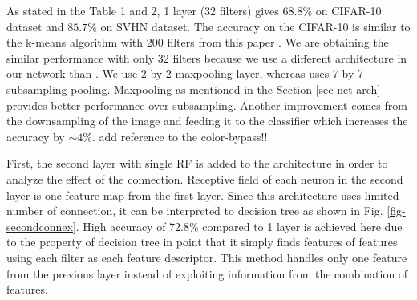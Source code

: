 \documentclass{article} %
\begin{document}
As stated in the Table 1 and 2, 1 layer (32 filters) gives $68.8\%$ on CIFAR-10 dataset and  $85.7\%$ on SVHN dataset.  The accuracy on the CIFAR-10 is similar to the k-means algorithm with 200 filters from this paper
\cite{coates_analysis_2011}. We are obtaining the similar performance with only 32 filters because we use a different architecture in our network than \cite{coates_analysis_2011}. We use 2 by 2 maxpooling layer, whereas \cite{coates_analysis_2011} uses 7 by 7 subsampling pooling. Maxpooling as mentioned in the Section \ref{sec-net-arch} provides better performance over subsampling. Another improvement comes from the downsampling of the image and feeding it to the classifier which increases the accuracy by  $\sim 4\%$. add reference to the color-bypass!!

First, the second layer with single RF is added to the architecture in order to analyze the effect of the connection. Receptive field of each neuron in the second layer is one feature map from the first layer. Since this architecture uses limited number of connection, it can be interpreted to decision tree as shown in Fig. \ref{fig-secondconnex}. High accuracy of 72.8\% compared to 1 layer is achieved here due to the property of decision tree in point that it simply finds features of features using each filter as each feature descriptor. This method handles only one feature from the previous layer instead of exploiting information from the combination of features.
\end{document}
